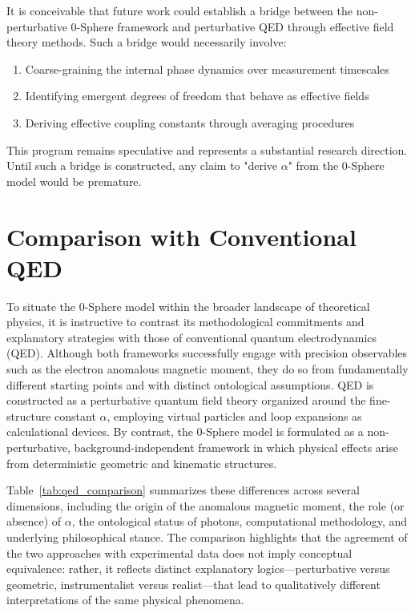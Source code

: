 \documentclass[12pt,letterpaper]{article}
\begin{document}
It is conceivable that future work could establish a bridge between the non-perturbative 0-Sphere framework and perturbative QED through effective field theory methods. Such a bridge would necessarily involve:
\begin{enumerate}
\item Coarse-graining the internal phase dynamics over measurement timescales
\item Identifying emergent degrees of freedom that behave as effective fields
\item Deriving effective coupling constants through averaging procedures
\end{enumerate}

This program remains speculative and represents a substantial research direction. Until such a bridge is constructed, any claim to "derive $\alpha$" from the 0-Sphere model would be premature.


\section{Comparison with Conventional QED}

To situate the 0-Sphere model within the broader landscape of theoretical physics, it is instructive to contrast its methodological commitments and explanatory strategies with those of conventional quantum electrodynamics (QED). 
Although both frameworks successfully engage with precision observables such as the electron anomalous magnetic moment, they do so from fundamentally different starting points and with distinct ontological assumptions. 
QED is constructed as a perturbative quantum field theory organized around the fine-structure constant $\alpha$, employing virtual particles and loop expansions as calculational devices. 
By contrast, the 0-Sphere model is formulated as a non-perturbative, background-independent framework in which physical effects arise from deterministic geometric and kinematic structures.

Table~\ref{tab:qed_comparison} summarizes these differences across several dimensions, including the origin of the anomalous magnetic moment, the role (or absence) of $\alpha$, the ontological status of photons, computational methodology, and underlying philosophical stance. 
The comparison highlights that the agreement of the two approaches with experimental data does not imply conceptual equivalence: rather, it reflects distinct explanatory logics—perturbative versus geometric, instrumentalist versus realist—that lead to qualitatively different interpretations of the same physical phenomena.
\end{document}
